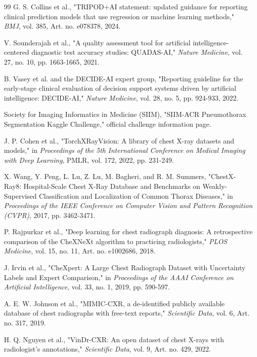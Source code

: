 \begin{thebibliography}{99}
 G. S. Collins et al., "TRIPOD+AI statement: updated guidance for reporting clinical prediction models that use regression or machine learning methods," \emph{BMJ}, vol. 385, Art. no. e078378, 2024.

 V. Sounderajah et al., "A quality assessment tool for artificial intelligence-centered diagnostic test accuracy studies: QUADAS-AI," \emph{Nature Medicine}, vol. 27, no. 10, pp. 1663-1665, 2021.

 B. Vasey et al. and the DECIDE-AI expert group, "Reporting guideline for the early-stage clinical evaluation of decision support systems driven by artificial intelligence: DECIDE-AI," \emph{Nature Medicine}, vol. 28, no. 5, pp. 924-933, 2022.

 Society for Imaging Informatics in Medicine (SIIM), "SIIM-ACR Pneumothorax Segmentation Kaggle Challenge," official challenge information page.

 J. P. Cohen et al., "TorchXRayVision: A library of chest X-ray datasets and models," in \emph{Proceedings of the 5th International Conference on Medical Imaging with Deep Learning}, PMLR, vol. 172, 2022, pp. 231-249.

 X. Wang, Y. Peng, L. Lu, Z. Lu, M. Bagheri, and R. M. Summers, "ChestX-Ray8: Hospital-Scale Chest X-Ray Database and Benchmarks on Weakly-Supervised Classification and Localization of Common Thorax Diseases," in \emph{Proceedings of the IEEE Conference on Computer Vision and Pattern Recognition (CVPR)}, 2017, pp. 3462-3471.

 P. Rajpurkar et al., "Deep learning for chest radiograph diagnosis: A retrospective comparison of the CheXNeXt algorithm to practicing radiologists," \emph{PLOS Medicine}, vol. 15, no. 11, Art. no. e1002686, 2018.

 J. Irvin et al., "CheXpert: A Large Chest Radiograph Dataset with Uncertainty Labels and Expert Comparison," in \emph{Proceedings of the AAAI Conference on Artificial Intelligence}, vol. 33, no. 1, 2019, pp. 590-597.

 A. E. W. Johnson et al., "MIMIC-CXR, a de-identified publicly available database of chest radiographs with free-text reports," \emph{Scientific Data}, vol. 6, Art. no. 317, 2019.

 H. Q. Nguyen et al., "VinDr-CXR: An open dataset of chest X-rays with radiologist's annotations," \emph{Scientific Data}, vol. 9, Art. no. 429, 2022.


\end{thebibliography}
